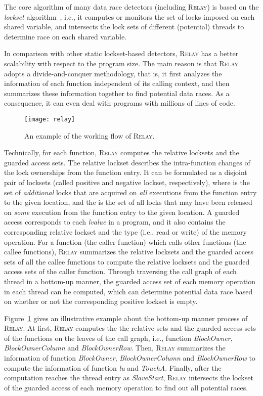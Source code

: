 \documentclass[10pt,onecolumn,letterpaper]{article}
\begin{document}
The core algorithm of many data race detectors (including
R\textsc{elay}) is based on the \emph{lockset}
algorithm~\cite{Savage97TCS}, i.e., it computes or monitors the set
of locks imposed on each shared variable, and intersects the lock
sets of different (potential) threads to determine race on each
shared variable.

In comparison with other static lockset-based detectors,
R\textsc{elay} has a better scalability with respect to the program
size. The main reason is that R\textsc{elay} adopts a
divide-and-conquer methodology, that is, it first analyzes the
information of each function independent of its calling context, and
then summarizes these information together to find potential data
races. As a consequence, it can even deal with programs with
millions of lines of code.

\begin{figure}
\centering
\texttt{[image: relay]}
\caption{An example of the working flow of
R\textsc{elay}.}\label{fig:relay}
\end{figure}

Technically, for each function, R\textsc{elay} computes the relative
locksets and the guarded access sets. The relative lockset describes
the intra-function changes of the lock ownerships from the function
entry. It can be formulated as a disjoint pair of locksets  (called positive and negative lockset, respectively), where
 is the set of \emph{additional} locks that are acquired on
\emph{all} executions from the function entry to the given location,
and the  is the set of all locks that may have been released on
\emph{some} execution from the function entry to the given location.
A guarded access corresponds to each \emph{lvalue} in a program, and
it also contains the corresponding relative lockset and the type
(i.e., read or write) of the memory operation. For a function (the
caller function) which calls other functions (the callee functions),
R\textsc{elay} summarizes the relative locksets and the guarded
access sets of all the callee functions to compute the relative
locksets and the guarded access sets of the caller function. Through
traversing the call graph of each thread in a bottom-up manner, the
guarded access set of each memory operation in each thread can be
computed, which can determine potential data race based on whether
or not the corresponding positive lockset is empty.


Figure~\ref{fig:relay} gives an illustrative example about the
bottom-up manner process of R\textsc{elay}. At first, R\textsc{elay}
computes the the relative sets and the guarded access sets of the
functions on the leaves of the call graph, i.e., function
\emph{BlockOwner}, \emph{BlockOwnerColumn} and \emph{BlockOwnerRow}.
Then, R\textsc{elay} summarizes the information of function
\emph{BlockOwner}, \emph{BlockOwnerColumn} and \emph{BlockOwnerRow}
to compute the information of function \emph{lu} and \emph{TouchA}.
Finally, after the computation reaches the thread entry as
\emph{SlaveStart}, R\textsc{elay} intersects the lockset of the
guarded access of each memory operation to find out all potential
races.
\end{document}
